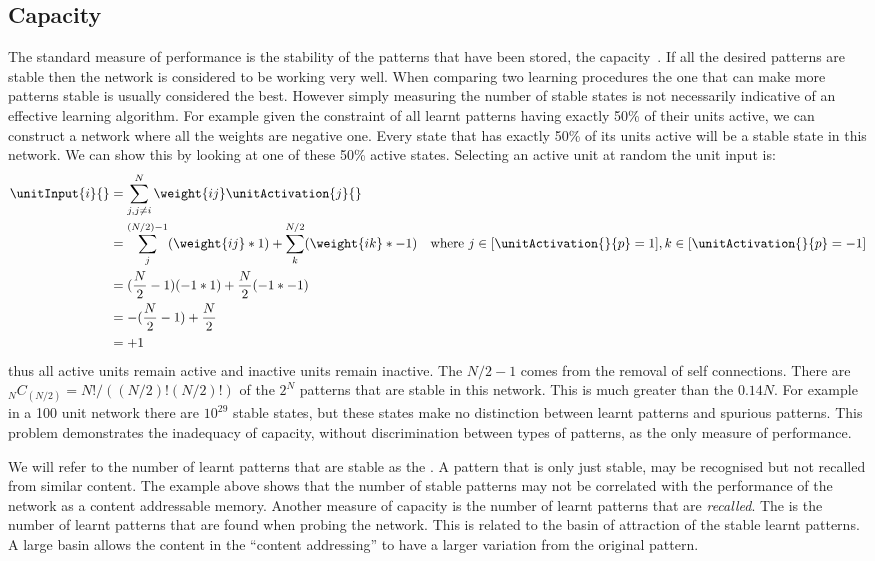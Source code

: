 \subsection{Capacity}
The standard measure of performance is the stability of the patterns that have been stored, the capacity~\citep{Hopfield82}.  If all the desired patterns are stable then the network is considered to be working very well.  When comparing two learning procedures the one that can make more patterns stable is usually considered the best. However simply measuring the number of stable states is not necessarily indicative of an effective learning algorithm.  For example given the constraint of all learnt patterns having exactly 50\% of their units active, we can construct a network where all the weights are negative one.  Every state that has exactly 50\% of its units active will be a stable state in this network.  We can show this by looking at one of these 50\% active states.  Selecting an active unit at random the unit input is:
\begin{align*}
	\label{eq:activeAll-1}
	\unitInput{i}{}&= \sum_{j, j \ne i}^{N} \weight{ij} \unitActivation{j}{}\\
										&= \sum_{j}^{(N/2)-1}(\weight{ij}*1) + \sum_{k}^{N/2}(\weight{ik}*-1) & \mbox{where }j\in[{\unitActivation{}{p}=1}] , k\in[{\unitActivation{}{p}=-1}]\\
										&= (\frac{N}{2}-1)(-1*1) + \frac{N}{2}(-1*-1)\\
										&= -(\frac{N}{2}-1)+ \frac{N}{2}\\
										&= +1
\end{align*}
thus all active units remain active and inactive units remain inactive.  The $N/2-1$ comes from the removal of self connections.  There are ${}_N C_{(N/2)} = N!/((N/2)!(N/2)!)$ of the $2^N$ patterns that are stable in this network.  This is much greater than the $0.14N$.  For example in a 100 unit network there are $10^{29}$ stable states, but these states make no distinction between learnt patterns and spurious patterns.  This problem demonstrates the inadequacy of capacity, without discrimination between types of patterns, as the only measure of performance.

We will refer to the number of learnt patterns that are stable as the . A pattern that is only just stable, may be recognised but not recalled from similar content.  The example above shows that the number of stable patterns may not be correlated with the performance of the network as a content addressable memory.  Another measure of capacity is the number of learnt patterns that are \emph{recalled}.  The  is the number of learnt patterns that are found when probing the network.  This is related to the basin of attraction of the stable learnt patterns.  A large basin allows the content in the ``content addressing'' to have a larger variation from the original pattern.


